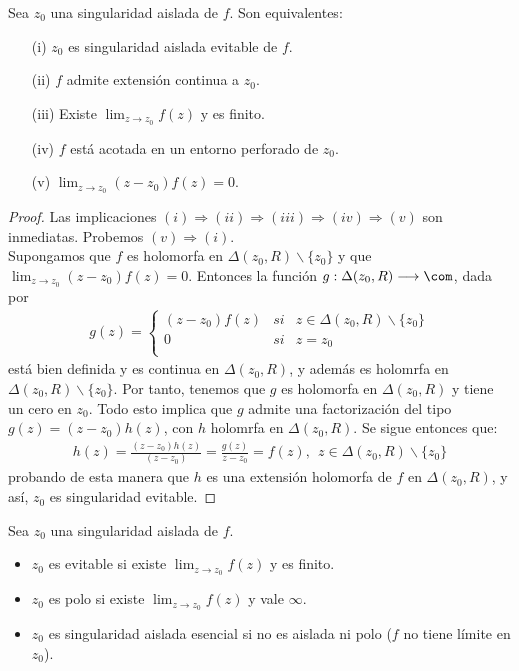 \begin{teo}
Sea $z_0$ una singularidad aislada de $f$. Son equivalentes:
\begin{enumerate}
    \item[(i)] $z_0$ es singularidad aislada evitable de $f$.
    \item[(ii)] $f$ admite extensión continua a $z_0$.
    \item[(iii)] Existe $\lim_{z \to z_0} f(z)$ y es finito.
    \item[(iv)] $f$ está acotada en un entorno perforado de $z_0$.
    \item[(v)] $\lim_{z \to z_0} (z-z_0)f(z) = 0$.
\end{enumerate}
\end{teo}

\begin{proof}
Las implicaciones $(i) \Longrightarrow (ii) \Longrightarrow (iii) \Longrightarrow (iv) \Longrightarrow (v)$ son inmediatas. Probemos $(v) \Longrightarrow (i)$.
\\
\newline
Supongamos que $f$ es holomorfa en $\Delta(z_0,R) \backslash \{z_0\}$ y que $\lim_{z \to z_0} (z-z_0)f(z) = 0$. Entonces la función $g: \Delta(z_0,R) \longrightarrow \com$, dada por 
\begin{align*}
    g(z) = \left\{ \begin{array}{lcc}
             (z-z_0)f(z) &  si  & z \in \Delta(z_0,R) \backslash \{z_0\}\\
             0 &  si & z = z_0 \\
             \end{array}
   \right.
\end{align*}
está bien definida y es continua en $\Delta(z_0,R)$, y además es holomrfa en $\Delta(z_0,R) \backslash \{z_0\}$. Por tanto, tenemos que $g$ es holomorfa en $\Delta(z_0,R)$ y tiene un cero en $z_0$. Todo esto implica que $g$ admite una factorización del tipo $g(z) = (z-z_0)h(z)$, con $h$ holomrfa en $\Delta(z_0,R)$. Se sigue entonces que:
\begin{align*}
    h(z) = \frac{(z-z_0)h(z)}{(z-z_0)} = \frac{g(z)}{z-z_0} = f(z), \ \ z \in \Delta(z_0,R) \backslash \{z_0\}
\end{align*}
probando de esta manera que $h$ es una extensión holomorfa de $f$ en $\Delta(z_0,R)$, y así, $z_0$ es singularidad evitable.
\end{proof}

\begin{defi}
Sea $z_0$ una singularidad aislada de $f$.
\begin{itemize}
    \item $z_0$ es evitable si existe $\lim_{z \to z_0} f(z)$ y es finito.
    \item $z_0$ es polo si existe $\lim_{z \to z_0} f(z)$ y vale $\infty$.
    \item $z_0$ es singularidad aislada esencial si no es aislada ni polo ($f$ no tiene límite en $z_0$).
\end{itemize}
\end{defi}

